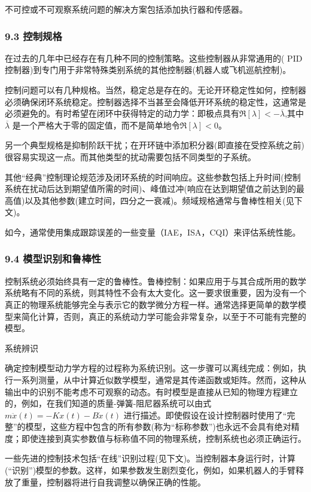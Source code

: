 不可控或不可观察系统问题的解决方案包括添加执行器和传感器。

\subsubsection{9.3 控制规格}

在过去的几年中已经存在有几种不同的控制策略。这些控制器从非常通用的( PID控制器)到专门用于非常特殊类别系统的其他控制器(机器人或飞机巡航控制)。

控制问题可以有几种规格。当然，稳定总是存在的。无论开环稳定性如何，控制器必须确保闭环系统稳定。控制器选择不当甚至会降低开环系统的稳定性，这通常是必须避免的。有时希望在闭环中获得特定的动力学：即极点具有$\Re[\lambda] < -\overline{\lambda}$,其中$\overline{\lambda}$ 是一个严格大于零的固定值，而不是简单地令$\Re[\lambda] < 0$。

另一个典型规格是抑制阶跃干扰；在开环链中添加积分器(即直接在受控系统之前)很容易实现这一点。而其他类型的扰动需要包括不同类型的子系统。

其他“经典”控制理论规范涉及闭环系统的时间响应。这些参数包括上升时间(控制系统在扰动后达到期望值所需的时间)、峰值过冲(响应在达到期望值之前达到的最高值)以及其他参数(建立时间，四分之一衰减)。频域规格通常与鲁棒性相关(见下文)。

如今，通常使用集成跟踪误差的一些变量（IAE，ISA，CQI）来评估系统性能。


\subsubsection{9.4 模型识别和鲁棒性}

控制系统必须始终具有一定的鲁棒性。鲁棒控制：如果应用于与其合成所用的数学系统略有不同的系统，则其特性不会有太大变化。这一要求很重要，因为没有一个真正的物理系统能够完全与表示它的数学微分方程一样。通常选择更简单的数学模型来简化计算，否则，真正的系统动力学可能会非常复杂，以至于不可能有完整的模型。

系统辨识

确定控制模型动力学方程的过程称为系统识别。这一步骤可以离线完成：例如，执行一系列测量，从中计算近似数学模型，通常是其传递函数或矩阵。然而，这种从输出中的识别不能考虑不可观察的动态。有时模型是直接从已知的物理方程建立的，例如，在我们知道的质量-弹簧-阻尼器系统可以由式$m\ddot{x}(t) = -Kx(t) - B\dot{x}(t)$ 进行描述。即使假设在设计控制器时使用了“完整”的模型，这些方程中包含的所有参数(称为“标称参数”)也永远不会具有绝对精度；即使连接到真实参数值与标称值不同的物理系统，控制系统也必须正确运行。

一些先进的控制技术包括“在线”识别过程(见下文)。当控制器本身运行时，计算(“识别”)模型的参数。这样，如果参数发生剧烈变化，例如，如果机器人的手臂释放了重量，控制器将进行自我调整以确保正确的性能。


